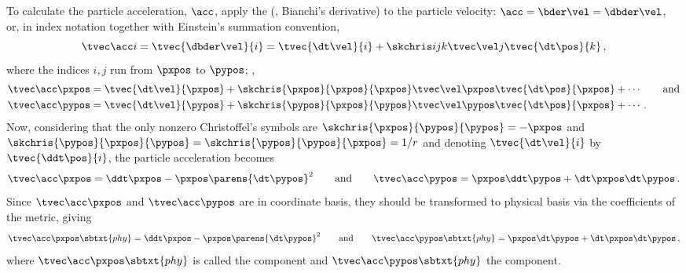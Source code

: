 \begin{solution}
To calculate the particle acceleration, $\acc$, apply the  (\aka, Bianchi's derivative) to the particle velocity: $\acc = \bder\vel = \dbder\vel$, or, in index notation together with Einstein's summation convention,
%
\begin{equation*}
  \tvec\acc i = \tvec{\dbder\vel}{i} 
                = \tvec{\dt\vel}{i} + \skchris ijk\tvec\vel j\tvec{\dt\pos}{k}\,,
\end{equation*}
%
where the indices $i,j$ run from $\pxpos$ to $\pypos$; \ie,
%
\begin{align*}
  \tvec\acc\pxpos &= \tvec{\dt\vel}{\pxpos} + \skchris{\pxpos}{\pxpos}{\pxpos}\tvec\vel\pxpos\tvec{\dt\pos}{\pxpos} + \dotsb \qquad\text{and} \\
  \tvec\acc\pypos &= \tvec{\dt\vel}{\pypos} + \skchris{\pypos}{\pxpos}{\pypos}\tvec\vel\pypos\tvec{\dt\pos}{\pxpos} + \dotsb \,.
\end{align*}
%
Now, considering that the only nonzero Christoffel's symbols are $\skchris{\pxpos}{\pypos}{\pypos} = -\pxpos$ and $\skchris{\pypos}{\pxpos}{\pypos} = \skchris{\pypos}{\pypos}{\pxpos} = 1/r$ and denoting $\tvec{\dt\vel}{i}$ by $\tvec{\ddt\pos}{i}$, the particle acceleration becomes
%
\begin{equation*}
  \tvec\acc\pxpos = \ddt\pxpos - \pxpos\parens{\dt\pypos}^2 \qquad\text{and}\qquad
  \tvec\acc\pypos = \pxpos\ddt\pypos + \dt\pxpos\dt\pypos \,.
\end{equation*}
%
Since $\tvec\acc\pxpos$ and $\tvec\acc\pypos$ are in coordinate basis, they should be transformed to physical basis via the coefficients of the metric, giving
%
\begin{equation*}
  \tvec\acc\pxpos\sbtxt{phy} = \ddt\pxpos - \pxpos\parens{\dt\pypos}^2 \qquad\text{and}\qquad
  \tvec\acc\pypos\sbtxt{phy} = \pxpos\dt\pypos + \dt\pxpos\dt\pypos                 \,,
\end{equation*}
%
where $\tvec\acc\pxpos\sbtxt{phy}$ is called the  component and $\tvec\acc\pypos\sbtxt{phy}$ the  component.
%
\end{solution}

